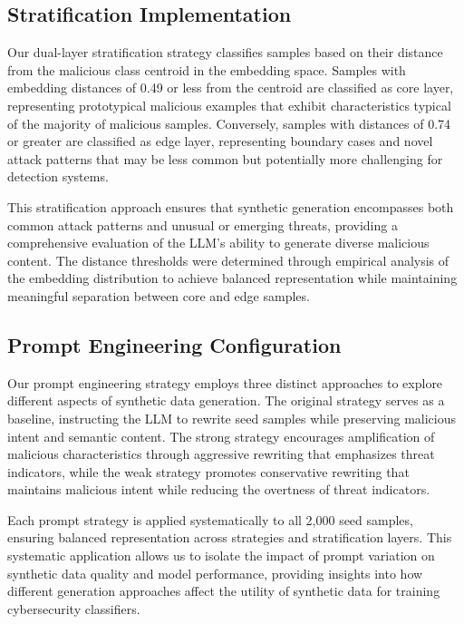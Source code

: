 \subsection{Stratification Implementation}

Our dual-layer stratification strategy classifies samples based on their distance from the malicious class centroid in the embedding space. Samples with embedding distances of 0.49 or less from the centroid are classified as core layer, representing prototypical malicious examples that exhibit characteristics typical of the majority of malicious samples. Conversely, samples with distances of 0.74 or greater are classified as edge layer, representing boundary cases and novel attack patterns that may be less common but potentially more challenging for detection systems.

This stratification approach ensures that synthetic generation encompasses both common attack patterns and unusual or emerging threats, providing a comprehensive evaluation of the LLM's ability to generate diverse malicious content. The distance thresholds were determined through empirical analysis of the embedding distribution to achieve balanced representation while maintaining meaningful separation between core and edge samples.

\subsection{Prompt Engineering Configuration}

Our prompt engineering strategy employs three distinct approaches to explore different aspects of synthetic data generation. The original strategy serves as a baseline, instructing the LLM to rewrite seed samples while preserving malicious intent and semantic content. The strong strategy encourages amplification of malicious characteristics through aggressive rewriting that emphasizes threat indicators, while the weak strategy promotes conservative rewriting that maintains malicious intent while reducing the overtness of threat indicators.

Each prompt strategy is applied systematically to all 2,000 seed samples, ensuring balanced representation across strategies and stratification layers. This systematic application allows us to isolate the impact of prompt variation on synthetic data quality and model performance, providing insights into how different generation approaches affect the utility of synthetic data for training cybersecurity classifiers.

